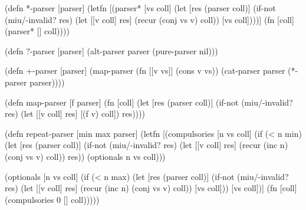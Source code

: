 \documentclass{beamer}
\begin{document}

\begin{frame}[fragile]

\begin{semiverbatim}
(defn *-parser [parser]
  (letfn [(parser* [vs coll]
            (let [res (parser coll)]
              (if-not (miu/-invalid? res)
                (let [[v coll] res]
                  (recur (conj vs v) coll))
                [vs coll])))]
    (fn [coll] (parser* [] coll))))
\end{semiverbatim}

\end{frame}


\begin{frame}[fragile]

\begin{semiverbatim}
(defn ?-parser [parser]
  (alt-parser parser (pure-parser nil)))
\end{semiverbatim}

\begin{semiverbatim}
(defn +-parser [parser]
  (map-parser (fn [[v vs]] (cons v vs))
              (cat-parser parser (*-parser parser))))
\end{semiverbatim}

\end{frame}


\begin{frame}[fragile]

\begin{semiverbatim}
(defn map-parser [f parser]
  (fn [coll]
    (let [res (parser coll)]
      (if-not (miu/-invalid? res)
        (let [[v coll] res]
          [(f v) coll])
        res))))
\end{semiverbatim}

\end{frame}


\begin{frame}[fragile]

{\scriptsize
\begin{semiverbatim}
(defn repeat-parser [min max parser]
  (letfn [(compulsories [n vs coll]
            (if (< n min)
              (let [res (parser coll)]
                (if-not (miu/-invalid? res)
                  (let [[v coll] res]
                    (recur (inc n) (conj vs v) coll))
                  res))
              (optionals n vs coll)))

          (optionals [n vs coll]
            (if (< n max)
              (let [res (parser coll)]
                (if-not (miu/-invalid? res)
                  (let [[v coll] res]
                    (recur (inc n) (conj vs v) coll))
                  [vs coll]))
              [vs coll])]
    (fn [coll] (compulsories 0 [] coll)))))
\end{semiverbatim}
}

\end{frame}
\end{document}
